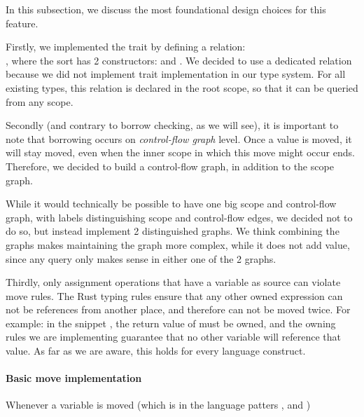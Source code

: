 In this subsection, we discuss the most foundational design choices for this feature.

Firstly, we implemented the  trait by defining a relation:\ \\, where the sort  has 2 constructors:  and . We decided to use a dedicated relation because we did not implement trait implementation in our type system. For all existing types, this relation is declared in the root scope, so that it can be queried from any scope.

Secondly (and contrary to borrow checking, as we will see), it is important to note that borrowing occurs on \textit{control-flow graph} level. Once a value is moved, it will stay moved, even when the inner scope in which this move might occur ends. Therefore, we decided to build a control-flow graph, in addition to the scope graph.

While it would technically be possible to have one big scope and control-flow graph, with labels distinguishing scope and control-flow edges, we decided not to do so, but instead implement 2 distinguished graphs. We think combining the graphs makes maintaining the graph more complex, while it does not add value, since any query only makes sense in either one of the 2 graphs.

Thirdly, only assignment operations that have a variable as source can violate move rules. The Rust typing rules ensure that any other owned expression can not be references from another place, and therefore can not be moved twice. For example: in the snippet , the return value of  must be owned, and the owning rules we are implementing guarantee that no other variable will reference that value. As far as we are aware, this holds for every language construct. 

\paragraph{Basic move implementation}

Whenever a variable is moved (which is in the language patters ,  and )